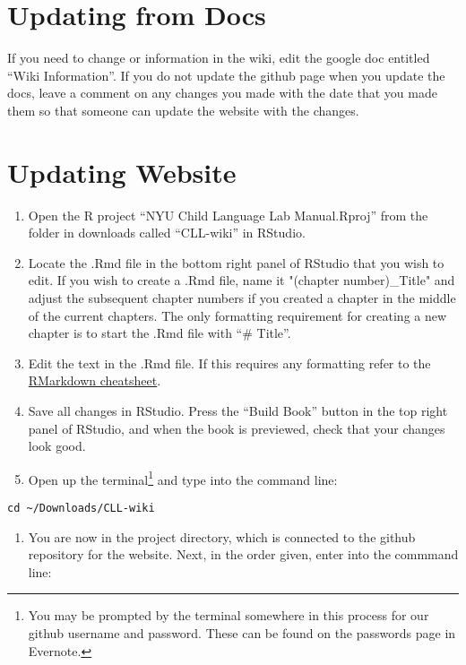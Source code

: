 \documentclass[
]{book}
\providecommand{\tightlist}{%
  \setlength{\itemsep}{0pt}\setlength{\parskip}{0pt}}
\begin{document}
\hypertarget{updating-from-docs}{%
\section{Updating from Docs}\label{updating-from-docs}}

If you need to change or information in the wiki, edit the google doc entitled ``Wiki Information''. If you do not update the github page when you update the docs, leave a comment on any changes you made with the date that you made them so that someone can update the website with the changes.

\hypertarget{updating-website}{%
\section{Updating Website}\label{updating-website}}

\begin{enumerate}
\def\labelenumi{\arabic{enumi}.}
\tightlist
\item
  Open the R project ``NYU Child Language Lab Manual.Rproj'' from the folder in downloads called ``CLL-wiki'' in RStudio.
\item
  Locate the .Rmd file in the bottom right panel of RStudio that you wish to edit. If you wish to create a .Rmd file, name it "(chapter number)\_Title" and adjust the subsequent chapter numbers if you created a chapter in the middle of the current chapters. The only formatting requirement for creating a new chapter is to start the .Rmd file with ``\# Title''.
\item
  Edit the text in the .Rmd file. If this requires any formatting refer to the \href{https://www.rstudio.com/wp-content/uploads/2016/03/rmarkdown-cheatsheet-2.0.pdf}{RMarkdown cheatsheet}.
\item
  Save all changes in RStudio. Press the ``Build Book'' button in the top right panel of RStudio, and when the book is previewed, check that your changes look good.
\item
  Open up the terminal\footnote{You may be prompted by the terminal somewhere in this process for our github username and password. These can be found on the passwords page in Evernote.} and type into the command line:
\end{enumerate}

\begin{verbatim}
cd ~/Downloads/CLL-wiki
\end{verbatim}

\begin{enumerate}
\def\labelenumi{\arabic{enumi}.}
\setcounter{enumi}{5}
\tightlist
\item
  You are now in the project directory, which is connected to the github repository for the website. Next, in the order given, enter into the commmand line:
\end{enumerate}
\end{document}

